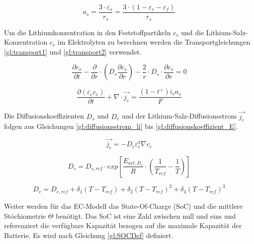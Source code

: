 \begin{equation}
	a_{s} = \frac{3\cdot \varepsilon_{s}}{r_{s}} = \frac{3 \cdot (1 - \varepsilon_{e} - \varepsilon_{f})}{r_{s}} \label{gl:surfacepervolume}
\end{equation}

Um die Lithiumkonzentration in den Feststoffpartikeln $c_{s}$ und die Lithium-Salz-Konzentration $c_{e}$ im Elektrolyten zu berechnen werden die Transportgleichungen \ref{gl:transport1} und \ref{gl:transport2} verwendet.

\begin{equation}
	\frac{\partial c_{s}}{\partial t} - \frac{\partial}{\partial r}\cdot \left( D_{s} \frac{\partial c_{s}}{\partial r} \right) - \frac{2}{r} \cdot D_{s} \cdot \frac{\partial c_{s}}{\partial r} = 0 \label{gl:transport1}
\end{equation}

\begin{equation}
	\frac{\partial (\varepsilon_{e}c_{e})}{\partial t} + \nabla \cdot \vec{j_{e}} = \frac{(1-t^{+}) i_{r} a_{s}}{F} \label{gl:transport2}
\end{equation}

Die Diffusionskoeffizienten $D_{s}$ und $D_{e}$ und der Lithium-Salz-Diffusionsstrom $\vec{j_{e}}$ folgen aus Gleichungen \ref{gl:diffusionsstrom_li} bis \ref{gl:diffusionskoeffizient_E}.

\begin{equation}
	\vec{j_{e}} = -D_{e} \varepsilon^{q}_{e} \nabla c_{e} \label{gl:diffusionsstrom_li}
\end{equation}

\begin{equation}
	D_{s} = D_{s,ref} \cdot exp \left[ \frac{E_{act,D_{s}}}{R} \cdot \left( \frac{1}{T_{ref}} - \frac{1}{T} \right) \right] \label{gl:diffusionskoeffizient_S}
\end{equation}

\begin{equation}
	D_{e} = D_{e,ref} + \delta_{1} (T- T_{ref}) + \delta_{2} (T- T_{ref})^{2} + \delta_{3} (T-T_{ref})^{3} \label{gl:diffusionskoeffizient_E}
\end{equation}

Weiter werden für das EC-Modell das State-Of-Charge (SoC) und die mittlere Stöchiometrie $\Theta$ benötigt. Das SoC ist eine Zahl zwischen null und eins und referenziert die verfügbare Kapazität bezogen auf die maximale Kapazität der Batterie. Es wird nach Gleichung \ref{gl:SOCDef} definiert. 

